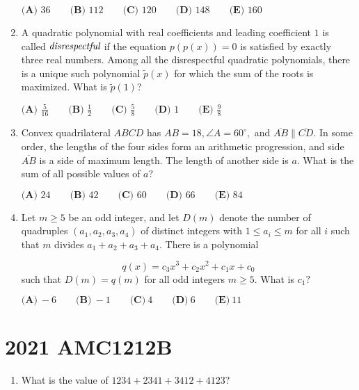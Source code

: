 \documentclass{article}
\begin{document}
\begin{enumerate}[label=\arabic*., itemsep=0.5em]
\(\textbf{(A) } 36 \qquad\textbf{(B) } 112 \qquad\textbf{(C) } 120 \qquad\textbf{(D) } 148 \qquad\textbf{(E) } 160\)\par \vspace{0.5em}\item A quadratic polynomial with real coefficients and leading coefficient \(1\) is called \(\emph{disrespectful}\) if the equation \(p(p(x))=0\) is satisfied by exactly three real numbers. Among all the disrespectful quadratic polynomials, there is a unique such polynomial \(\tilde{p}(x)\) for which the sum of the roots is maximized. What is \(\tilde{p}(1)\)?

\(\textbf{(A) } \frac{5}{16} \qquad\textbf{(B) } \frac{1}{2} \qquad\textbf{(C) } \frac{5}{8} \qquad\textbf{(D) } 1 \qquad\textbf{(E) } \frac{9}{8}\)\par \vspace{0.5em}\item Convex quadrilateral \(ABCD\) has \(AB = 18, \angle{A} = 60^\circ,\) and \(\overline{AB} \parallel \overline{CD}.\) In some order, the lengths of the four sides form an arithmetic progression, and side \(\overline{AB}\) is a side of maximum length. The length of another side is \(a.\) What is the sum of all possible values of \(a\)?

\(\textbf{(A) } 24 \qquad \textbf{(B) } 42 \qquad \textbf{(C) } 60 \qquad \textbf{(D) } 66 \qquad \textbf{(E) } 84\)\par \vspace{0.5em}\item Let \(m\ge 5\) be an odd integer, and let \(D(m)\) denote the number of quadruples \((a_1, a_2, a_3, a_4)\) of distinct integers with \(1\le a_i \le m\) for all \(i\) such that \(m\) divides \(a_1+a_2+a_3+a_4\). There is a polynomial

\begin{equation*}
q(x) = c_3x^3+c_2x^2+c_1x+c_0
\end{equation*}
such that \(D(m) = q(m)\) for all odd integers \(m\ge 5\). What is \(c_1?\)

\(\textbf{(A)}\ {-}6\qquad\textbf{(B)}\ {-}1\qquad\textbf{(C)}\ 4\qquad\textbf{(D)}\ 6\qquad\textbf{(E)}\ 11\)\par \vspace{0.5em}\end{enumerate}\newpage\section*{2021 AMC1212B}\begin{enumerate}[label=\arabic*., itemsep=0.5em]\item What is the value of \(1234+2341+3412+4123?\)


\end{enumerate}
\end{document}
